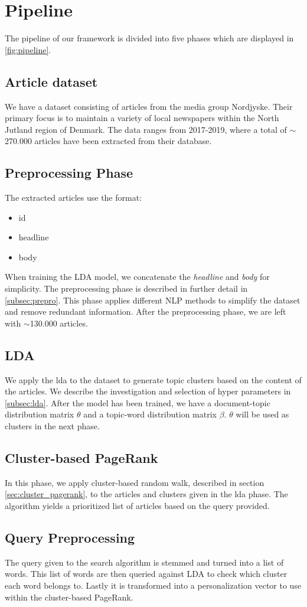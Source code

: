 \section{Pipeline}


The pipeline of our framework is divided into five phases which are displayed in \autoref{fig:pipeline}.

\subsection{Article dataset}
We have a dataset consisting of articles from the media group Nordjyske. Their primary focus is to maintain a variety of local newspapers within the North Jutland region of Denmark. 
The data ranges from 2017-2019, where a total of $\sim$270.000 articles have been extracted from their database.

\subsection{Preprocessing Phase}
The extracted articles use the format:
\begin{itemize}
	\item id
	\item headline
	\item body
\end{itemize}
When training the LDA model, we concatenate the \emph{headline} and \emph{body} for simplicity.
The preprocessing phase is described in further detail in \ref{subsec:prepro}.
This phase applies different \gls{NLP} methods to simplify the dataset and remove redundant information.
After the preprocessing phase, we are left with $\sim$130.000 articles.

\subsection{LDA}
We apply the \acrfull{lda} to the dataset to generate topic clusters based on the content of the articles. 
We describe the investigation and selection of hyper parameters in \ref{subsec:lda}. 
After the model has been trained, we have a document-topic distribution matrix $\theta$ and a topic-word distribution matrix $\beta$.
$\theta$ will be used as clusters in the next phase.

\subsection{Cluster-based PageRank}
In this phase, we apply cluster-based random walk, described in section \ref{sec:cluster_pagerank}, to the articles and clusters given in the \gls{lda} phase.
The algorithm yields a prioritized list of articles based on the query provided.


\subsection{Query Preprocessing}
The query given to the search algorithm is stemmed and turned into a list of words. 
This list of words are then queried against LDA to check which cluster each word belongs to.
Lastly it is transformed into a personalization vector to use within the cluster-based PageRank.
